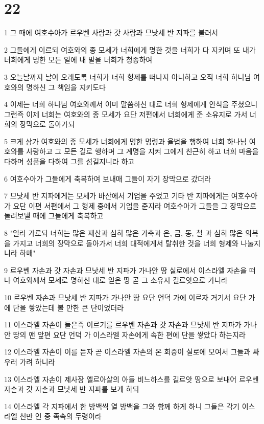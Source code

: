 \chapter{22}

\par 1 그 때에 여호수아가 르우벤 사람과 갓 사람과 므낫세 반 지파를 불러서
\par 2 그들에게 이르되 여호와의 종 모세가 너희에게 명한 것을 너희가 다 지키며 또 내가 너희에게 명한 모든 일에 내 말을 너희가 청종하여
\par 3 오늘날까지 날이 오래도록 너희가 너희 형제를 떠나지 아니하고 오직 너희 하니님 여호와의 명하신 그 책임을 지키도다
\par 4 이제는 너희 하나님 여호와께서 이미 말씀하신 대로 너희 형제에게 안식을 주셨으니 그런즉 이제 너희는 여호와의 종 모세가 요단 저편에서 너희에게 준 소유지로 가서 너희의 장막으로 돌아가되
\par 5 크게 삼가 여호와의 종 모세가 너희에게 명한 명령과 율법을 행하여 너희 하나님 여호와를 사랑하고 그 모든 길로 행하며 그 계명을 지켜 그에게 친근히 하고 너희 마음을 다하며 성품을 다하여 그를 섬길지니라 하고
\par 6 여호수아가 그들에게 축복하여 보내매 그들이 자기 장막으로 갔더라
\par 7 므낫세 반 지파에게는 모세가 바산에서 기업을 주었고 기타 반 지파에게는 여호수아가 요단 이편 서편에서 그 형제 중에서 기업을 준지라 여호수아가 그들을 그 장막으로 돌려보낼 때에 그들에게 축복하고
\par 8 "일러 가로되 너희는 많은 재산과 심히 많은 가축과 은, 금, 동, 철 과 심히 많은 의복을 가지고 너희의 장막으로 돌아가서 너희 대적에게서 탈취한 것을 너희 형제와 나눌지니라 하매"
\par 9 르우벤 자손과 갓 자손과 므낫세 반 지파가 가나안 땅 실로에서 이스라엘 자손을 떠나 여호와께서 모세로 명하신 대로 얻은 땅 곧 그 소유지 길르앗으로 가니라
\par 10 르우벤 자손과 므낫세 반 지파가 가나안 땅 요단 언덕 가에 이르자 거기서 요단 가에 단을 쌓았는데 볼 만한 큰 단이었더라
\par 11 이스라엘 자손이 들은즉 이르기를 르우벤 자손과 갓 자손과 므낫세 반 지파가 가나안 땅의 맨 앞편 요단 언덕 가 이스라엘 자손에게 속한 편에 단을 쌓았다 하는지라
\par 12 이스라엘 자손이 이를 듣자 곧 이스라엘 자손의 온 회중이 실로에 모여서 그들과 싸우러 가려 하니라
\par 13 이스라엘 자손이 제사장 엘르아살의 아들 비느하스를 길르앗 땅으로 보내어 르우벤 자손과 갓 자손과 므낫세 반 지파를 보게 하되
\par 14 이스라엘 각 지파에서 한 방백씩 열 방백을 그와 함께 하게 하니 그들은 각기 이스라엘 천만 인 중 족속의 두령이라

